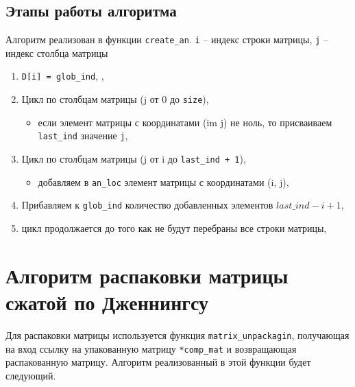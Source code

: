 \subsection*{Этапы работы алгоритма}
Алгоритм реализован в функции \texttt{create\_an}. \texttt{i} -- индекс строки матрицы, \texttt{j} -- индекс столбца матрицы 

\begin{enumerate}
	\item \texttt{D[i] = glob\_ind}, ,
	
	\item Цикл по столбцам матрицы (j от 0 до \texttt{size}),
	\begin{itemize}
		\item если элемент матрицы с координатами (im j) не ноль, то присваиваем \texttt{last\_ind} значение \texttt{j},
	\end{itemize}
	
	\item Цикл по столбцам матрицы (j от i до \texttt{last\_ind + 1}),
	\begin{itemize}
		\item добавляем в \texttt{an\_loc} элемент матрицы с координатами (i, j),
	\end{itemize}
	
	\item Прибавляем к \texttt{glob\_ind} количество добавленных элементов $last\_ind - i + 1$,
	
	\item цикл продолжается до того как не будут перебраны все строки матрицы,
\end{enumerate}

\section{Алгоритм распаковки матрицы сжатой по Дженнингсу}
Для распаковки матрицы используется функция \texttt{matrix\_unpackagin}, получающая на вход ссылку на упакованную матрицу \texttt{*comp\_mat} и возвращающая распакованную матрицу. Алгоритм реализованный в этой функции будет следующий.
